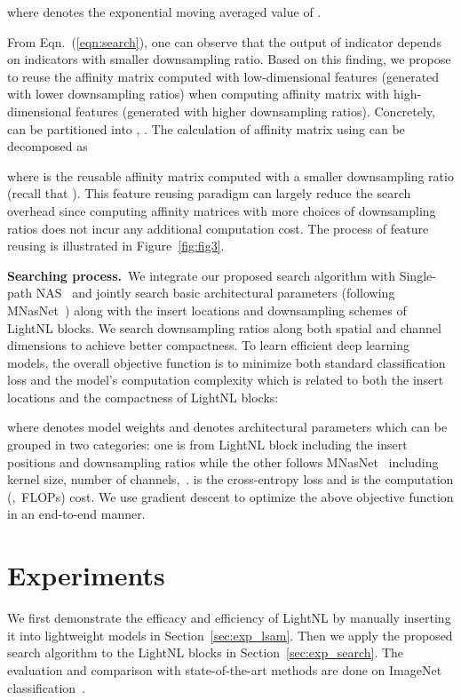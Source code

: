 \documentclass[10pt,twocolumn,letterpaper]{article}
\begin{document}
where  denotes the exponential moving averaged value of .

From Eqn.~(\ref{eqn:search}), one can observe that the 
output of indicator depends on indicators with smaller downsampling ratio. Based on this finding, we propose to reuse the affinity matrix computed with low-dimensional features (generated with lower downsampling ratios) when computing affinity matrix with high-dimensional features (generated with higher downsampling ratios).
Concretely,  can be partitioned into , . The calculation of affinity matrix using  can be decomposed as

where  is the reusable affinity matrix computed with a smaller downsampling ratio (recall that ). This feature reusing paradigm can largely reduce the search overhead since computing affinity matrices with more choices of downsampling ratios does not incur any additional computation cost. The process of feature reusing is illustrated in Figure~\ref{fig:fig3}.

\vspace{0.5ex}\noindent\textbf{Searching process.}~We integrate our proposed search algorithm with Single-path NAS~\cite{stamoulis2019single} and jointly search basic architectural parameters (following MNasNet~\cite{tan2019mnasnet}) along with the insert locations and downsampling schemes of LightNL blocks.
We search downsampling ratios along both spatial and channel dimensions to achieve better compactness.
To learn efficient deep learning models, the overall objective function is to minimize both standard classification loss and the model's computation complexity which is related to both the insert locations and the compactness of LightNL blocks:

where  denotes model weights and  denotes architectural parameters which can be grouped in two categories: one is from LightNL block including the insert positions and downsampling ratios while the other follows MNasNet~\cite{tan2019mnasnet} including kernel size, number of channels,~\etc.  is the cross-entropy loss and  is the computation (\ie,~FLOPs) cost. We use gradient descent to optimize the above objective function in an end-to-end manner.


\section{Experiments} \label{sec:exp}
We first demonstrate the efficacy and efficiency of LightNL by manually inserting it into lightweight models in Section~\ref{sec:exp_lsam}. Then we apply the proposed search algorithm to the LightNL blocks in Section~\ref{sec:exp_search}. The evaluation and comparison with state-of-the-art methods are done on ImageNet classification~\cite{deng2009imagenet}.
\end{document}
